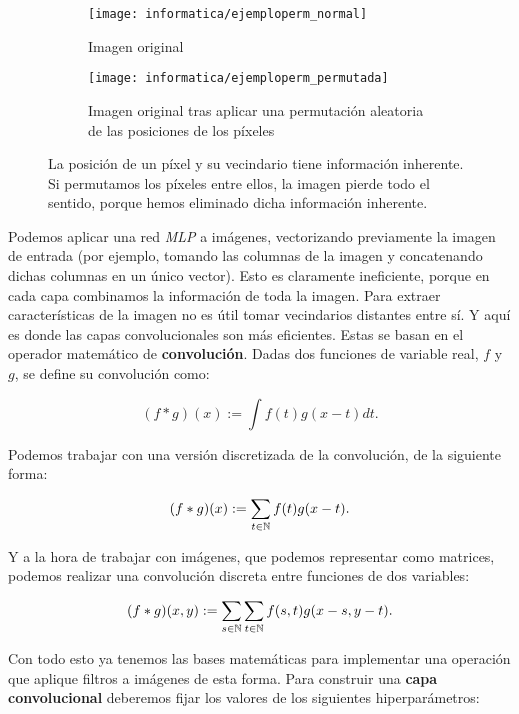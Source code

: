 \begin{figure}[H]
	\centering
	\ajustarsubcaptions
	\begin{subfigure}[t]{0.45\textwidth}
		\centering
		\texttt{[image: informatica/ejemploperm\_normal]}
		\caption{Imagen original}
	\end{subfigure}
	\begin{subfigure}[t]{0.45\textwidth}
		\centering
		\texttt{[image: informatica/ejemploperm\_permutada]}
		\caption{Imagen original tras aplicar una permutación aleatoria de las posiciones de los píxeles}
	\end{subfigure}
	\caption{La posición de un píxel y su vecindario tiene información inherente. Si permutamos los píxeles entre ellos, la imagen pierde todo el sentido, porque hemos eliminado dicha información inherente.}
	\label{img:desordenar_pixeles}
\end{figure}

Podemos aplicar una red \textit{MLP} a imágenes, vectorizando previamente la imagen de entrada (por ejemplo, tomando las columnas de la imagen y concatenando dichas columnas en un único vector). Esto es claramente ineficiente, porque en cada capa combinamos la información de toda la imagen. Para extraer características de la imagen no es útil tomar vecindarios distantes entre sí. Y aquí es donde las capas convolucionales son más eficientes. Estas se basan en el operador matemático de \textbf{convolución}. Dadas dos funciones de variable real, $f$ y $g$, se define su convolución como:

\begin{equation}
	(f * g)(x) := \int f(t) g(x - t) dt.
\end{equation}

Podemos trabajar con una versión discretizada de la convolución, de la siguiente forma:

\begin{equation}
	(f * g)(x) := \sum_{t \in \mathbb{N}} f(t) g(x - t).
\end{equation}

Y a la hora de trabajar con imágenes, que podemos representar como matrices, podemos realizar una convolución discreta entre funciones de dos variables:

\begin{equation}
	(f * g)(x, y) := \sum_{s \in \mathbb{N}} \sum_{t \in \mathbb{N}} f(s, t) g(x - s, y - t).
\end{equation}

Con todo esto ya tenemos las bases matemáticas para implementar una operación que aplique filtros a imágenes de esta forma. Para construir una \textbf{capa convolucional} deberemos fijar los valores de los siguientes hiperparámetros:


